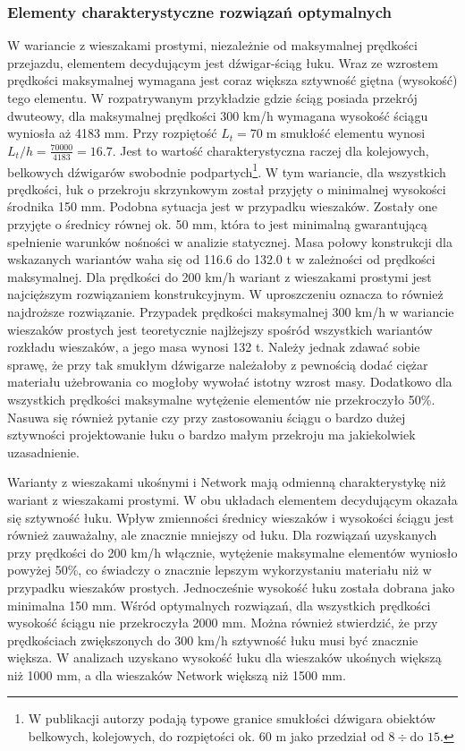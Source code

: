 \subsubsection{Elementy charakterystyczne rozwiązań optymalnych}
W wariancie z wieszakami prostymi, niezależnie od maksymalnej prędkości przejazdu, elementem decydującym jest dźwigar-ściąg łuku. Wraz ze wzrostem prędkości maksymalnej wymagana jest coraz większa sztywność giętna (wysokość) tego elementu. W rozpatrywanym przykładzie gdzie ściąg posiada przekrój dwuteowy, dla maksymalnej prędkości 300 km/h wymagana wysokość ściągu wyniosła aż 4183 mm. Przy rozpiętość $L_t=70\;\mathrm{m}$ smukłość elementu wynosi $L_t/h=\frac{70 000}{4183}=16.7$. Jest to wartość charakterystyczna raczej dla kolejowych, belkowych dźwigarów swobodnie podpartych\footnote{
		W publikacji \cite{Madaj2009} autorzy podają typowe granice smukłości dźwigara obiektów belkowych, kolejowych, do rozpiętości ok. 60 m jako przedział od $8 \div \text{do } 15$.}. 
W tym wariancie, dla wszystkich prędkości, łuk o przekroju skrzynkowym został przyjęty o minimalnej wysokości środnika 150 mm. Podobna sytuacja jest w przypadku wieszaków. Zostały one przyjęte o średnicy równej ok. 50 mm, która to jest minimalną gwarantującą spełnienie warunków nośności w analizie statycznej. Masa połowy konstrukcji dla wskazanych wariantów waha się od 116.6 do 132.0 t w zależności od prędkości maksymalnej. Dla prędkości do 200 km/h wariant z wieszakami prostymi jest najcięższym rozwiązaniem konstrukcyjnym. W uproszczeniu oznacza to również najdroższe rozwiązanie. Przypadek prędkości maksymalnej 300 km/h w wariancie wieszaków prostych jest teoretycznie najlżejszy spośród wszystkich wariantów rozkładu wieszaków, a jego masa wynosi 132 t. Należy jednak zdawać sobie sprawę, że przy tak smukłym dźwigarze należałoby z pewnością dodać ciężar materiału użebrowania co mogłoby wywołać istotny wzrost masy. Dodatkowo dla wszystkich prędkości maksymalne wytężenie elementów nie przekroczyło 50\%. Nasuwa się również pytanie czy przy zastosowaniu ściągu o bardzo dużej sztywności projektowanie łuku o bardzo małym przekroju ma jakiekolwiek uzasadnienie. 


Warianty z wieszakami ukośnymi i Network mają odmienną charakterystykę niż wariant z wieszakami prostymi. W obu układach elementem decydującym okazała się sztywność łuku. Wpływ zmienności średnicy wieszaków i wysokości ściągu jest również zauważalny, ale znacznie mniejszy od łuku. Dla rozwiązań uzyskanych przy prędkości do 200 km/h włącznie, wytężenie maksymalne elementów wyniosło powyżej 50\%, co świadczy o znacznie lepszym wykorzystaniu materiału niż w przypadku wieszaków prostych. Jednocześnie wysokość łuku została dobrana jako minimalna 150 mm. Wśród optymalnych rozwiązań, dla wszystkich prędkości wysokość ściągu nie przekroczyła 2000 mm. Można również stwierdzić, że przy prędkościach zwiększonych do 300 km/h sztywność łuku musi być znacznie większa. W analizach uzyskano wysokość łuku dla wieszaków ukośnych większą niż 1000 mm, a dla wieszaków Network większą niż 1500 mm.

